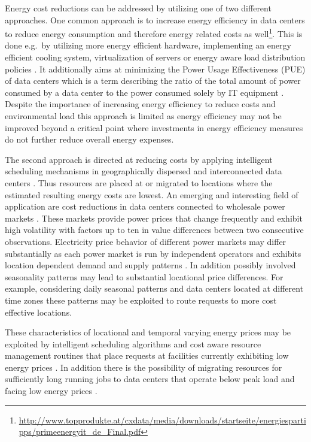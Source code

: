 Energy cost reductions can be addressed by utilizing one of two different approaches. One common approach is to increase energy efficiency in data centers to reduce energy consumption and therefore energy related costs as well\footnote{\url{http://www.topprodukte.at/cxdata/media/downloads/startseite/energiespartipps/primeenergyit_de_Final.pdf}}. This is done e.g.~by utilizing more energy efficient hardware, implementing an energy efficient cooling system, virtualization of servers or energy aware load distribution policies \cite{berl2010energy}. It additionally aims at minimizing the Power Usage Effectiveness (PUE) of data centers which is a term describing the ratio of the total amount of power consumed by a data center to the power consumed solely by IT equipment \cite{avelar2012pue}. 
Despite the importance of increasing energy efficiency to reduce costs and environmental load this approach is limited as energy efficiency may not be improved beyond a critical point where investments in energy efficiency measures do not further reduce overall energy expenses. 

The second approach is directed at reducing costs by applying intelligent scheduling mechanisms in geographically dispersed and interconnected data centers \cite{guler2013cutting, qureshi2009cutting}. Thus resources are placed at or migrated to locations where the estimated resulting energy costs are lowest. 
An emerging and interesting field of application are cost reductions in data centers connected to wholesale power markets \cite{rao2010minimizing}. These markets provide power prices that change frequently and exhibit high volatility with factors up to ten in value differences between two consecutive observations. 
Electricity price behavior of different power markets may differ substantially as each power market is run by independent operators and exhibits location dependent demand and supply patterns \cite{mugele2005stable}. In addition possibly involved seasonality patterns may lead to substantial locational price differences. For example, considering daily seasonal patterns and data centers located at different time zones these patterns may be exploited to route requests to more cost effective locations. 

These characteristics of locational and temporal varying energy prices may be exploited by intelligent scheduling algorithms and cost aware resource management routines that place requests at facilities currently exhibiting low energy prices \cite{rao2010minimizing}. In addition there is the possibility of migrating resources for sufficiently long running jobs to data centers that operate below peak load and facing low energy prices \cite{buchbinder2011online}.

